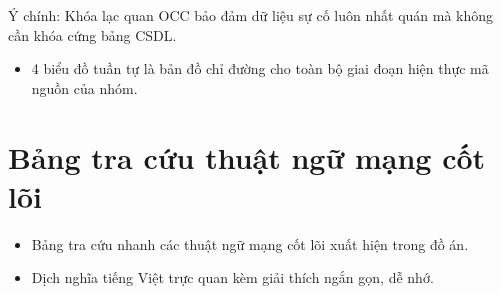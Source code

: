\documentclass[12pt,a4paper]{article}
\begin{document}
Ý chính: Khóa lạc quan OCC bảo đảm dữ liệu sự cố luôn nhất quán mà không cần khóa cứng bảng CSDL.

\begin{takeawaybox}
\begin{itemize}[leftmargin=1.5em, itemsep=1pt]
  \item 4 biểu đồ tuần tự là bản đồ chỉ đường cho toàn bộ giai đoạn hiện thực mã nguồn của nhóm.
\end{itemize}
\end{takeawaybox}

\section{Bảng tra cứu thuật ngữ mạng cốt lõi}

\begin{summarybox}
\begin{itemize}[leftmargin=1.5em, itemsep=1pt]
  \item Bảng tra cứu nhanh các thuật ngữ mạng cốt lõi xuất hiện trong đồ án.
  \item Dịch nghĩa tiếng Việt trực quan kèm giải thích ngắn gọn, dễ nhớ.
\end{itemize}
\end{summarybox}
\end{document}
